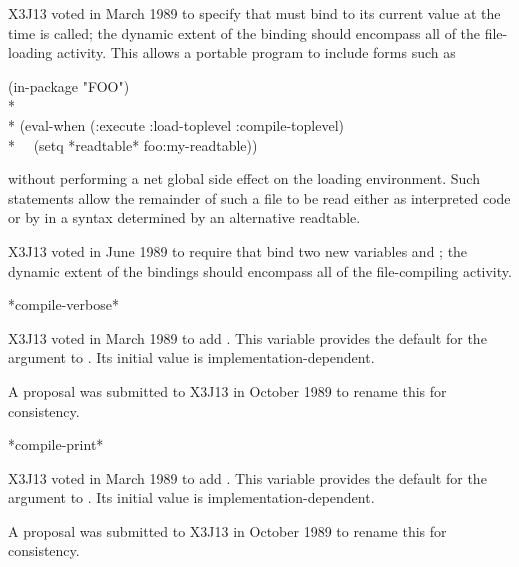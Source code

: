 \begin{newer}
X3J13 voted in March 1989 
to specify that  must bind  to its current value
at the time  is called; the dynamic extent of the binding
should encompass all of the file-loading activity.
This allows a portable program to include forms such as
\begin{lisp}
(in-package "FOO") \\*
\\*
(eval-when (:execute :load-toplevel :compile-toplevel) \\*
~~(setq *readtable* foo:my-readtable))
\end{lisp}
without performing a net global side effect on the loading environment.
Such statements allow the remainder of such a file to be read either as
interpreted code or by  in a syntax determined by
an alternative readtable.
\end{newer}

\begin{newer}
X3J13 voted in June 1989 
to require that  bind two new variables
 and ; the dynamic extent of the bindings
should encompass all of the file-compiling activity.
\end{newer}

\begin{newer}
\begin{defun}[Variable]
*compile-verbose*

X3J13 voted in March 1989 
to add .
This variable provides the default for the  argument
to .  Its initial value is implementation-dependent.

A proposal was submitted to X3J13 in October 1989
to rename this  for consistency.
\end{defun}
\end{newer}

\begin{newer}
\begin{defun}[Variable]
*compile-print*

X3J13 voted in March 1989 
to add .
This variable provides the default for the  argument
to .  Its initial value is implementation-dependent.

A proposal was submitted to X3J13 in October 1989
to rename this   for consistency.
\end{defun}
\end{newer}


